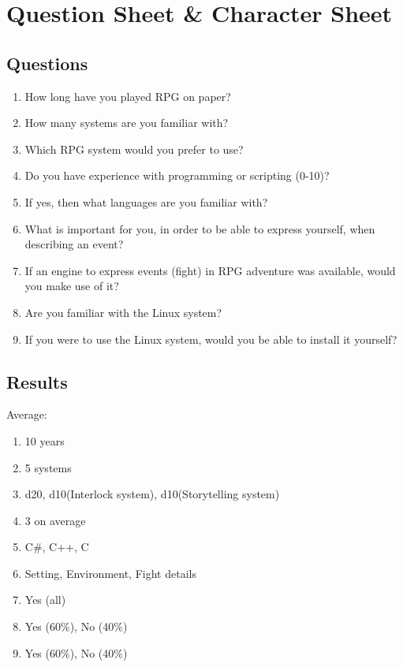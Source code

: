 \chapter{Question Sheet \& Character Sheet}
\label{qsheets}

\section*{Questions}

\begin{enumerate}
\item How long have you played RPG on paper?
\item How many systems are you familiar with?
\item Which RPG system would you prefer to use?
\item Do you have experience with programming or scripting (0-10)?
\item If yes, then what languages are you familiar with?
\item What is important for you, in order to be able to express yourself, when describing an event?
\item If an engine to express events (fight) in RPG adventure was available, would you make use of it?
\item Are you familiar with the Linux system?
\item If you were to use the Linux system, would you be able to install it yourself?
\end{enumerate}

\pagebreak

\section*{Results}

Average:
\begin{enumerate}
\item 10 years
\item 5 systems
\item d20, d10(Interlock system), d10(Storytelling system)
\item 3 on average
\item C\#, C++, C
\item Setting, Environment, Fight details
\item Yes (all)
\item Yes (60\%), No (40\%)
\item Yes (60\%), No (40\%)
\end{enumerate}

\pagebreak